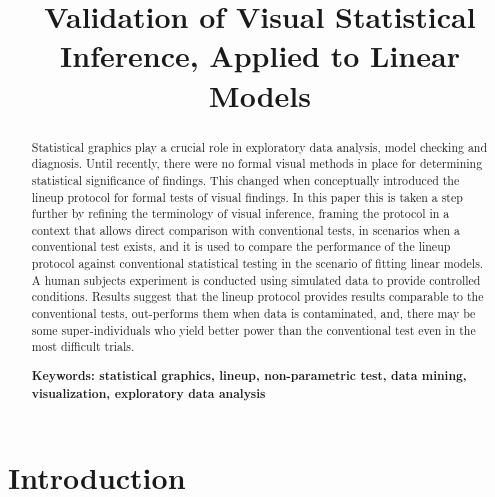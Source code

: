 \documentclass[12pt]{article}
\begin{document}
\title{Validation of Visual Statistical Inference, Applied to Linear Models}
\date{\vspace{-.7in}}
\maketitle

\begin {abstract}  
Statistical graphics play a crucial role in exploratory data analysis, model checking and diagnosis. Until recently, there were no formal visual methods in place for determining statistical significance of findings. This changed when \citet{buja:2009} conceptually introduced the lineup protocol for formal tests of visual findings. In this paper this is taken a step further by refining the terminology of visual inference, framing the protocol in a context that allows direct comparison with conventional tests, in scenarios when a conventional test exists, and it is used to compare the performance of the lineup protocol against conventional statistical testing in the scenario of fitting linear models. A human subjects experiment is conducted using simulated data to provide controlled conditions. Results suggest that the lineup protocol provides results comparable to the conventional tests, out-performs them when data is contaminated, and, there may be some super-individuals who yield better power than the conventional test even in the most difficult trials.

{\bf Keywords: \sf statistical graphics, lineup, non-parametric test, data mining, visualization, exploratory data analysis} 
\end {abstract}


\section{Introduction} 

\end{document}
